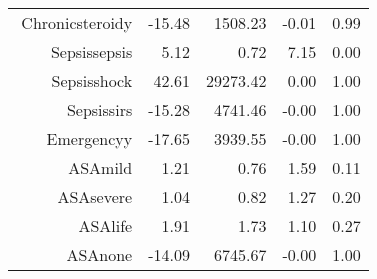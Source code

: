 \begin{tabular}{rrrrr}
$$  Chronic\-steroid\-y & -15.48 & 1508.23 & -0.01 & 0.99 \\ 
  Sepsis\-sepsis & 5.12 & 0.72 & 7.15 & 0.00 \\ 
  Sepsis\-shock & 42.61 & 29273.42 & 0.00 & 1.00 \\ 
  Sepsis\-sirs & -15.28 & 4741.46 & -0.00 & 1.00 \\ 
  Emergency\-y & -17.65 & 3939.55 & -0.00 & 1.00 \\ 
  ASA\-mild & 1.21 & 0.76 & 1.59 & 0.11 \\ 
  ASA\-severe & 1.04 & 0.82 & 1.27 & 0.20 \\ 
  ASA\-life & 1.91 & 1.73 & 1.10 & 0.27 \\ 
  ASA\-none & -14.09 & 6745.67 & -0.00 & 1.00 \\ 
   \hline
\end{tabular}

